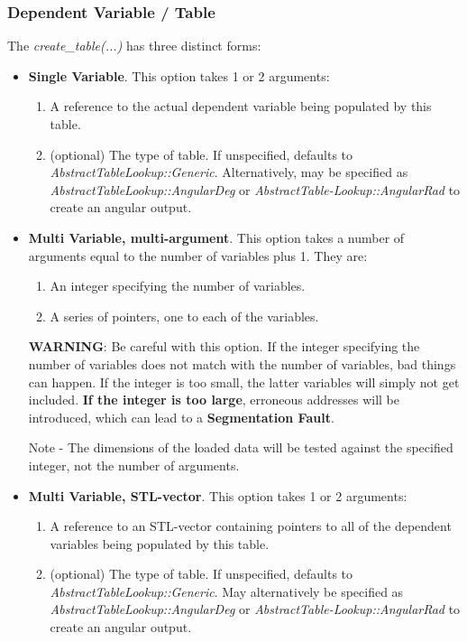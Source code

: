 \documentclass[11pt,fleqn]{report}
\begin{document}
\subsubsection{Dependent Variable / Table}
The \textit{create\_table(...)} has three distinct forms:
\begin{itemize}
 \item \textbf{Single Variable}.  This option takes 1 or 2 arguments:
   \begin{enumerate}
    \item A reference to the actual dependent variable being populated
     by this table.
    \item (optional) The type of table.  If unspecified, defaults to
     \textit{AbstractTableLookup::Generic}.  Alternatively, may be
     specified as \textit{AbstractTableLookup::AngularDeg} or
     \textit{AbstractTable-Lookup::AngularRad} to create an angular output.
  \end{enumerate}

 \item \textbf{Multi Variable, multi-argument}.  This option takes a number of
   arguments equal to the number of variables plus 1.  They are:
  \begin{enumerate}
   \item An integer specifying the number of variables.
   \item A series of pointers, one to each of the variables.
  \end{enumerate}
  \textbf{WARNING}:  Be careful with this option.  If the integer
   specifying the number of variables does not match with the number of
   variables, bad things can happen.  If the integer is too small, the latter
   variables will simply not get included.
  \textbf{If the integer is too large},
   erroneous addresses will be introduced, which can lead to a
   \textbf{Segmentation Fault}.

  Note - The dimensions of the loaded data will be tested against the
  specified integer, not the number of arguments.

 \item \textbf{Multi Variable, STL-vector}.  This option takes 1 or 2
   arguments:
   \begin{enumerate}
    \item A reference to an STL-vector containing pointers to all of the
    dependent variables being populated by this table.
    \item (optional) The type of table.  If unspecified, defaults to
    \textit{AbstractTableLookup::Generic}.  May alternatively be specified as
    \textit{AbstractTableLookup::AngularDeg} or
    \textit{AbstractTable-Lookup::AngularRad} to create an angular output.
  \end{enumerate}
\end{itemize}
\end{document}

